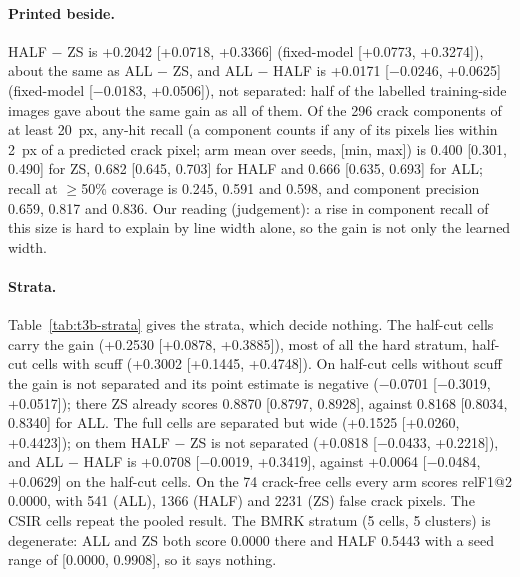 \paragraph{Printed beside.} HALF $-$ ZS is +0.2042 [+0.0718, +0.3366] (fixed-model [+0.0773, +0.3274]), about the same as ALL $-$
ZS, and ALL $-$ HALF is +0.0171 [$-$0.0246, +0.0625] (fixed-model [$-$0.0183, +0.0506]), not separated: half of the labelled
training-side images gave about the same gain as all of them. Of the 296 crack components of at least 20~px, any-hit recall (a
component counts if any of its pixels lies within 2~px of a predicted crack pixel; arm mean over seeds, [min, max]) is 0.400
[0.301, 0.490] for ZS, 0.682 [0.645, 0.703] for HALF and 0.666 [0.635, 0.693] for ALL; recall at $\geq$50\% coverage is 0.245,
0.591 and 0.598, and component precision 0.659, 0.817 and 0.836. Our reading (judgement): a rise in component recall of this size is
hard to explain by line width alone, so the gain is not only the learned width.

\paragraph{Strata.} Table~\ref{tab:t3b-strata} gives the strata, which decide nothing. The half-cut cells carry the gain
(+0.2530 [+0.0878, +0.3885]), most of all the hard stratum, half-cut cells with scuff (+0.3002 [+0.1445, +0.4748]). On half-cut
cells without scuff the gain is not separated and its point estimate is negative ($-$0.0701 [$-$0.3019, +0.0517]); there ZS already
scores 0.8870 [0.8797, 0.8928], against 0.8168 [0.8034, 0.8340] for ALL. The full cells are separated but wide (+0.1525 [+0.0260,
+0.4423]); on them HALF $-$ ZS is not separated (+0.0818 [$-$0.0433, +0.2218]), and ALL $-$ HALF is +0.0708 [$-$0.0019, +0.3419],
against +0.0064 [$-$0.0484, +0.0629] on the half-cut cells. On the 74 crack-free cells every arm scores relF1@2 0.0000, with 541
(ALL), 1366 (HALF) and 2231 (ZS) false crack pixels. The CSIR cells repeat the pooled result. The BMRK stratum (5 cells, 5 clusters)
is degenerate: ALL and ZS both score 0.0000 there and HALF 0.5443 with a seed range of [0.0000, 0.9908], so it says nothing.

